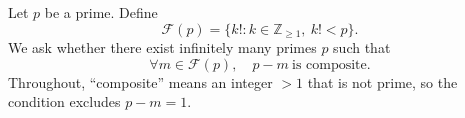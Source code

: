 Let $p$ be a prime. Define
\[
\mathcal F(p)=\{k! : k\in\mathbb Z_{\ge 1},\ k!<p\}.
\]
We ask whether there exist infinitely many primes $p$ such that
\[
\forall m\in\mathcal F(p),\quad p-m\ \text{is composite}.
\]
Throughout, ``composite'' means an integer $>1$ that is not prime, so the condition excludes $p-m=1$.
